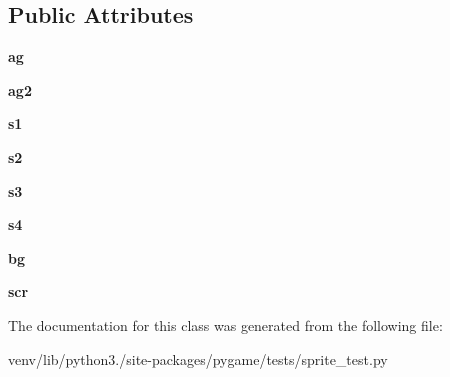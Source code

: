 \subsection*{Public Attributes}
\begin{DoxyCompactItemize}
\item 
\mbox{\label{classpygame_1_1tests_1_1sprite__test_1_1_abstract_group_type_test_a081d34321fb8bf32cc4e330ad4aff735}} 
{\bfseries ag}
\item 
\mbox{\label{classpygame_1_1tests_1_1sprite__test_1_1_abstract_group_type_test_af4b1099d1c04d100ae75099fbca8f90e}} 
{\bfseries ag2}
\item 
\mbox{\label{classpygame_1_1tests_1_1sprite__test_1_1_abstract_group_type_test_aa863bef8c3e1731879c4c0f138017c64}} 
{\bfseries s1}
\item 
\mbox{\label{classpygame_1_1tests_1_1sprite__test_1_1_abstract_group_type_test_acb06174d31e4b95137524c17748185aa}} 
{\bfseries s2}
\item 
\mbox{\label{classpygame_1_1tests_1_1sprite__test_1_1_abstract_group_type_test_ab79638d0b2c368ba630491ae85aa95db}} 
{\bfseries s3}
\item 
\mbox{\label{classpygame_1_1tests_1_1sprite__test_1_1_abstract_group_type_test_a95f665d1265bd791aee31cdb028cb7ff}} 
{\bfseries s4}
\item 
\mbox{\label{classpygame_1_1tests_1_1sprite__test_1_1_abstract_group_type_test_a7a4f22b315f7ab274e520a86f8130e43}} 
{\bfseries bg}
\item 
\mbox{\label{classpygame_1_1tests_1_1sprite__test_1_1_abstract_group_type_test_af0b1a362fac1a98b3ead9a9e6da2152b}} 
{\bfseries scr}
\end{DoxyCompactItemize}


The documentation for this class was generated from the following file\+:\begin{DoxyCompactItemize}
\item 
venv/lib/python3./site-\/packages/pygame/tests/sprite\+\_\+test.\+py\end{DoxyCompactItemize}
